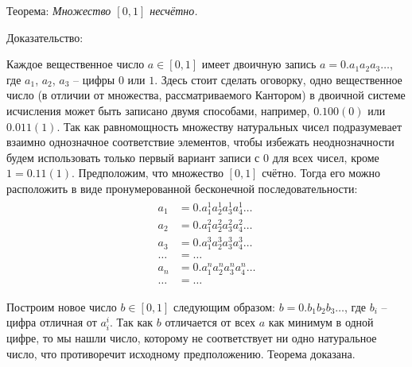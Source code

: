 \documentclass[12pt]{article}
\begin{document}
Теорема: {\sl Множество $[0, 1]$ несчётно.}

Доказательство:

Каждое вещественное число $a \in [0, 1]$ имеет двоичную запись $a = 0.a_1a_2a_3\dots$, где $a_1$, $a_2$, $a_3$ – цифры $0$ или $1$. Здесь стоит сделать оговорку, одно вещественное число (в отличии от множества, рассматриваемого Кантором) в двоичной системе исчисления может быть записано двумя способами, например, $0.100(0)$ или $0.011(1)$. Так как равномощность множеству натуральных чисел подразумевает взаимно однозначное соответствие элементов, чтобы избежать неоднозначности будем использовать только первый вариант записи с $0$ для всех чисел, кроме $1 = 0.11(1)$. Предположим, что множество $[0, 1]$ счётно. Тогда его можно расположить в виде пронумерованной бесконечной последовательности:
\begin{align}
\begin{split}
a_1 &= 0.a^1_1 a^1_2 a^1_3 a^1_4\dots\\
a_2 &= 0.a^2_1 a^2_2 a^2_3 a^2_4\dots\\
a_3 &= 0.a^3_1 a^3_2 a^3_3 a^3_4\dots\\
\dots &= \dots\\
a_n &= 0.a^n_1 a^n_2 a^n_3 a^n_4\dots\\
\dots &= \dots
\end{split}
\end{align}

Построим новое число $b \in [0, 1]$ следующим образом: $b = 0.b_1b_2b_3\dots$, где $b_i$ – цифра отличная от $a^i_i$. Так как $b$ отличается от всех $a$ как минимум в одной цифре, то мы нашли число, которому не соответствует ни одно натуральное число, что противоречит исходному предположению. Теорема доказана.
\end{document}
